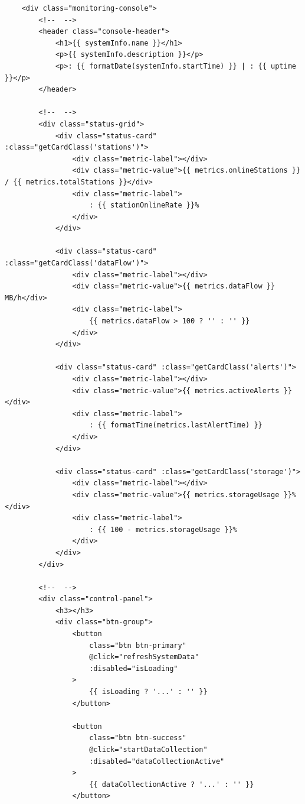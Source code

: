\begin{verbatim}
    <div class="monitoring-console">
        <!--  -->
        <header class="console-header">
            <h1>{{ systemInfo.name }}</h1>
            <p>{{ systemInfo.description }}</p>
            <p>: {{ formatDate(systemInfo.startTime) }} | : {{ uptime }}</p>
        </header>
        
        <!--  -->
        <div class="status-grid">
            <div class="status-card" :class="getCardClass('stations')">
                <div class="metric-label"></div>
                <div class="metric-value">{{ metrics.onlineStations }} / {{ metrics.totalStations }}</div>
                <div class="metric-label">
                    : {{ stationOnlineRate }}%
                </div>
            </div>
            
            <div class="status-card" :class="getCardClass('dataFlow')">
                <div class="metric-label"></div>
                <div class="metric-value">{{ metrics.dataFlow }} MB/h</div>
                <div class="metric-label">
                    {{ metrics.dataFlow > 100 ? '' : '' }}
                </div>
            </div>
            
            <div class="status-card" :class="getCardClass('alerts')">
                <div class="metric-label"></div>
                <div class="metric-value">{{ metrics.activeAlerts }}</div>
                <div class="metric-label">
                    : {{ formatTime(metrics.lastAlertTime) }}
                </div>
            </div>
            
            <div class="status-card" :class="getCardClass('storage')">
                <div class="metric-label"></div>
                <div class="metric-value">{{ metrics.storageUsage }}%</div>
                <div class="metric-label">
                    : {{ 100 - metrics.storageUsage }}%
                </div>
            </div>
        </div>
        
        <!--  -->
        <div class="control-panel">
            <h3></h3>
            <div class="btn-group">
                <button 
                    class="btn btn-primary" 
                    @click="refreshSystemData"
                    :disabled="isLoading"
                >
                    {{ isLoading ? '...' : '' }}
                </button>
                
                <button 
                    class="btn btn-success" 
                    @click="startDataCollection"
                    :disabled="dataCollectionActive"
                >
                    {{ dataCollectionActive ? '...' : '' }}
                </button>
                

\end{verbatim}
